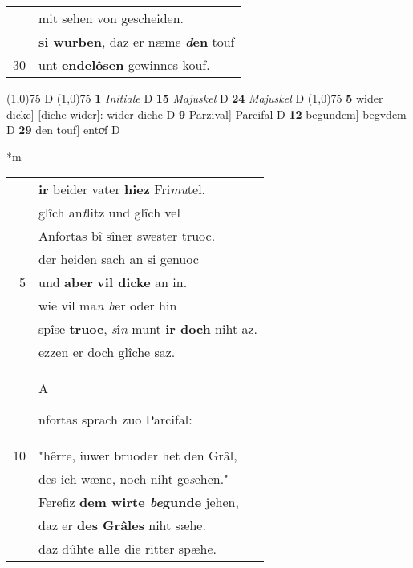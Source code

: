 \documentclass[8pt,a4paper,notitlepage]{article}
\begin{document}
\begin{table}[ht]
\begin{minipage}[t]{0.5\linewidth}
\begin{tabular}{rl}
 & mit sehen von gescheiden.\\ 
 & \textbf{si wurben}, daz er næme \textbf{\textit{d}en} touf\\ 
30 & unt \textbf{endelôsen} gewinnes kouf.\\ 
\end{tabular}
\scriptsize
\line(1,0){75} \newline
D \newline
\line(1,0){75} \newline
\textbf{1} \textit{Initiale} D  \textbf{15} \textit{Majuskel} D  \textbf{24} \textit{Majuskel} D  \newline
\line(1,0){75} \newline
\textbf{5} wider dicke] [diche wider]: wider diche D \textbf{9} Parzival] Parcifal D \textbf{12} begundem] begvdem D \textbf{29} den touf] entoͮf D \newline
\end{minipage}
\hspace{0.5cm}
\begin{minipage}[t]{0.5\linewidth}
\small
\begin{center}*m
\end{center}
\begin{tabular}{rl}
 & \textbf{ir} beider vater \textbf{hiez} Fri\textit{mu}tel.\\ 
 & glîch an\textit{t}litz und glîch vel\\ 
 & Anfortas bî sîner swester truoc.\\ 
 & der heiden sach an si genuoc\\ 
5 & und \textbf{aber} \textbf{vil dicke} an in.\\ 
 & wie vil ma\textit{n h}er oder hin\\ 
 & spîse \textbf{truoc}, \textit{s}î\textit{n} munt \textbf{ir doch} niht az.\\ 
 & ezzen er doch glîche saz.\\ 
 & \begin{large}A\end{large}nfortas sprach zuo Parcifal:\\ 
10 & "hêrre, iuwer bruoder het den Grâl,\\ 
 & des ich wæne, noch niht ge\textit{s}ehen."\\ 
 & Ferefiz \textbf{dem wirte \textit{be}gunde} jehen,\\ 
 & daz er \textbf{des Grâles} niht sæhe.\\ 
 & daz dûhte \textbf{alle} die ritter spæhe.\\ 

\end{tabular}
\end{minipage}
\end{table}
\end{document}
